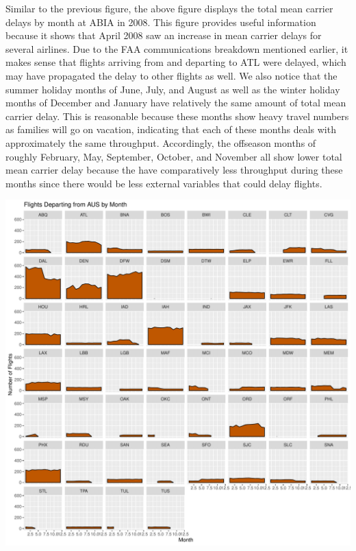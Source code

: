 \documentclass[]{article}
\begin{document}
Similar to the previous figure, the above figure displays the total mean
carrier delays by month at ABIA in 2008. This figure provides useful
information because it shows that April 2008 saw an increase in mean
carrier delays for several airlines. Due to the FAA communications
breakdown mentioned earlier, it makes sense that flights arriving from
and departing to ATL were delayed, which may have propagated the delay
to other flights as well. We also notice that the summer holiday months
of June, July, and August as well as the winter holiday months of
December and January have relatively the same amount of total mean
carrier delay. This is reasonable because these months show heavy travel
numbers as families will go on vacation, indicating that each of these
months deals with approximately the same throughput. Accordingly, the
offseason months of roughly February, May, September, October, and
November all show lower total mean carrier delay because the have
comparatively less throughput during these months since there would be
less external variables that could delay flights.

\includegraphics{Report_files/figure-latex/abia4-1.pdf}
\end{document}
